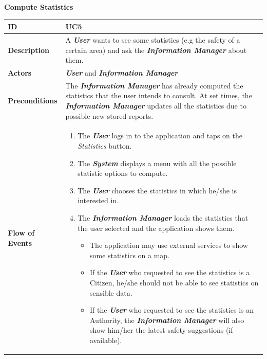 \documentclass{report}
\begin{document}
\begin{center}
	\textbf{Compute Statistics}
\end{center}
\begin{tabularx}{\linewidth}{| l | X |}
	\hline
	\textbf{ID} & UC5\\
	
	\hline
	\textbf{Description} & A \textbf{\textit{User}} wants to see some statistics (e.g the safety of a certain area) and ask the \textbf{\textit{Information Manager}} about them.\\
	
	\hline
	\textbf{Actors} & \textbf{\textit{User}} and \textbf{\textit{Information Manager}}\\
	
	\hline
	\textbf{Preconditions} & The \textbf{\textit{Information Manager}} has already computed the statistics that the user intends to consult. At set times, the \textbf{\textit{Information Manager}} updates all the statistics due to possible new stored reports. \\
	
	\hline
	\textbf{Flow of Events} & \parbox{0.7\textwidth}{\begin{enumerate}
			\item The \textbf{\textit{User}} logs in to the application and taps on the \textit{Statistics} button.
			\item The \textbf{\textit{System}} displays a menu with all the possible statistic options to compute.
			\item The \textbf{\textit{User}} chooses the statistics in which he/she is interested in.
			
			\item The \textbf{\textit{Information Manager}} loads the statistics that the user selected and the application shows them. 
			\begin{itemize}
				\item The application may use external services to show some statistics on a map.
				\item If the \textbf{\textit{User}} who requested to see the statistics is a Citizen, he/she should not be able to see statistics on sensible data.
				\item If the \textbf{\textit{User}} who requested to see the statistics is an Authority, the \textbf{\textit{Information Manager}} will also show him/her the latest safety suggestions (if available).
			\end{itemize}
			
	\end{enumerate}}\\
	

\end{tabularx}
\end{document}
